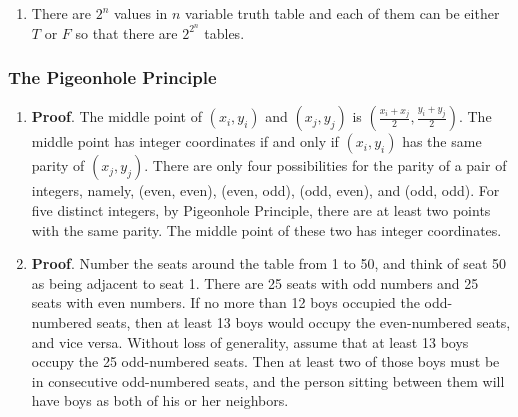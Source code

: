 \documentclass{sig-alternate-05-2015}
\begin{document}
\begin{enumerate}
	Let $A_k$ be the set of numbers less than $10, 000$ ( i.e. less than or equal
	to $9999$ ) which are divisible by k. Then $|A_k| = \lfloor 9999/k \rfloor$ (since if
	$\lfloor 9999/k \rfloor =m$ then $mk \leq 9999 < (m + 1)k$.
	
	By the principle of inclusion-exclusion and the preceding observations,
	the number of positive integers less than $10000$ which are divisible
	by $4$, $5$ or $6$ is
	
	$|A_4\cup A_5 \cup A_6|=|A_4|+|A_5|+|A_6|-|A_{20}|-|A_{21}|-|A_{30}|+|A_{60}|
	=\lfloor \frac{9999}{4} \rfloor+ \lfloor \frac{9999}{5} \rfloor+\lfloor \frac{9999}{6} \rfloor-\lfloor \frac{9999}{20} \rfloor-\lfloor \frac{9999}{12} \rfloor-\lfloor \frac{9999}{30} \rfloor+\lfloor \frac{9999}{60} \rfloor=2499+1999+1666-499-833-333+166=4665$.
	
	The answer is therefore $10000-4666=5335$.
	
	\item There are $2^n$ values in $n$ variable truth table and each of them can be either $T$ or $F$ so that there are $2^{2^n}$ tables.
\end{enumerate}
\subsubsection{The Pigeonhole Principle}
\begin{enumerate}
	\item \textbf{Proof}. The middle point of $(x_i, y_i)$ and $(x_j, y_j)$ is $(\frac{x_i + x_j}{2}, \frac{y_i + y_j}{2})$. The middle point has integer coordinates if and only if $(x_i, y_i)$ has the same parity of $(x_j, y_j)$.  There are only
	four possibilities for the parity of a pair of integers, namely, (even, even), (even, odd),
	(odd, even), and (odd, odd). For five distinct integers, by Pigeonhole Principle, there
	are at least two points with the same parity. The middle point of these two has integer
	coordinates.
	
	\item \textbf{Proof}. Number the seats around the table
	from 1 to 50, and think of seat 50 as being adjacent to seat 1.
	There are 25 seats with odd numbers and 25 seats with even
	numbers. If no more than 12 boys occupied the odd-numbered seats, then at least 13 boys would occupy the even-numbered
	seats, and vice versa. Without loss of generality, assume that
	at least 13 boys occupy the 25 odd-numbered seats. Then at
	least two of those boys must be in consecutive odd-numbered
	seats, and the person sitting between them will have boys as
	both of his or her neighbors.
\end{enumerate}
\end{document}
